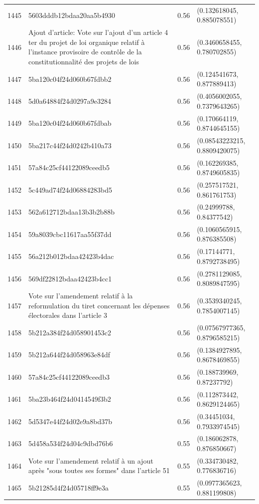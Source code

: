 \begin{table}[ht]
\begin{tabular}{rlrl}
  1445 & 5603dddb12bdaa20aa5b4930 & 0.56 & (0.132618045, 0.885078551) \\ 
  1446 & Ajout d'article: Vote sur l'ajout d'un article 4 ter du projet de loi organique relatif à l'instance provisoire de contrôle de la constitutionnalité des projets de lois & 0.56 & (0.3460658455, 0.780702855) \\ 
  1447 & 5ba120c04f24d060b67fdbb2 & 0.56 & (0.124541673, 0.877889413) \\ 
  1448 & 5d0a64884f24d0297a9e3284 & 0.56 & (0.4056002055, 0.7379643265) \\ 
  1449 & 5ba120c04f24d060b67fdbab & 0.56 & (0.170664119, 0.8744645155) \\ 
  1450 & 5ba217c44f24d0242b410a73 & 0.56 & (0.08543223215, 0.8809420075) \\ 
  1451 & 57a84c25cf44122089ceedb5 & 0.56 & (0.162269385, 0.8749605835) \\ 
  1452 & 5c449ad74f24d06884283bd5 & 0.56 & (0.257517521, 0.861761753) \\ 
  1453 & 562a612712bdaa13b3b2b88b & 0.56 & (0.24999788, 0.84377542) \\ 
  1454 & 59a8039cbc11617aa55f37dd & 0.56 & (0.1060565915, 0.876385508) \\ 
  1455 & 56a212b012bdaa42423b4dac & 0.56 & (0.17144771, 0.8792738495) \\ 
  1456 & 569df22812bdaa42423b4cc1 & 0.56 & (0.2781129085, 0.8089847595) \\ 
  1457 & Vote sur l'amendement relatif à la reformulation du tiret concernant les dépenses électorales dans l'article 3 & 0.56 & (0.3539340245, 0.7854007145) \\ 
  1458 & 5b212a384f24d058901453c2 & 0.56 & (0.07567977365, 0.8796585215) \\ 
  1459 & 5b212a644f24d058963e84df & 0.56 & (0.1384927895, 0.8678469855) \\ 
  1460 & 57a84c25cf44122089ceedb3 & 0.56 & (0.188739969, 0.87237792) \\ 
  1461 & 5ba23b464f24d0414549f3b2 & 0.56 & (0.112873442, 0.8629124465) \\ 
  1462 & 5d5347e44f24d02e9a8bd37b & 0.56 & (0.34451034, 0.7933974545) \\ 
  1463 & 5d458a534f24d04c9dbd76b6 & 0.55 & (0.186062878, 0.876850667) \\ 
  1464 & Vote sur l'amendement relatif à un ajout après "sous toutes ses formes" dans l'article 51 & 0.55 & (0.334730482, 0.776836716) \\ 
  1465 & 5b21285d4f24d05718ff9e3a & 0.55 & (0.0977365623, 0.881199808) \\ 

\end{tabular}
\end{table}
